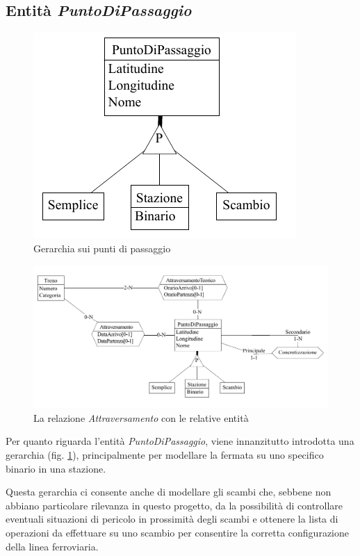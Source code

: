 \documentclass[a4paper,12pt]{report}
\begin{document}
	\subsection{Entità \textit{PuntoDiPassaggio}}
	\begin{figure}[h!]
		\begin{center}
			\includegraphics{res/schema/pdp}
		\end{center}
		\caption{Gerarchia sui punti di passaggio}
		\label{fig:pdp}
	\end{figure}
	\begin{figure}[h!]
		\begin{center}
			\includegraphics[width=\linewidth]{res/schema/attraversamento}
		\end{center}
		\caption{La relazione \textit{Attraversamento} con le relative entità}
		\label{fig:attraversamento}
	\end{figure}
	\par Per quanto riguarda l'entità \textit{PuntoDiPassaggio}, viene innanzitutto introdotta una gerarchia (fig. \ref{fig:pdp}), principalmente per modellare la fermata su uno specifico binario in una stazione.
	\par Questa gerarchia ci consente anche di modellare gli scambi che, sebbene non abbiano particolare rilevanza in questo progetto, da la possibilità di controllare eventuali situazioni di pericolo in prossimità degli scambi e ottenere la lista di operazioni da effettuare su uno scambio per consentire la corretta configurazione della linea ferroviaria.
\end{document}
